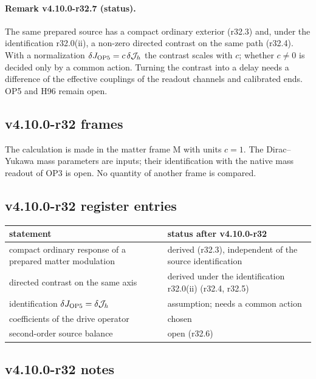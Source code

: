 \paragraph{Remark v4.10.0-r32.7 (status).}
The same prepared source has a compact ordinary exterior (r32.3) and, under the identification r32.0(ii), a non-zero directed contrast on
the same path (r32.4).  With a normalization \(\delta J_{\rm OP5}=c\,\delta\mathcal J_h\) the contrast scales with \(c\); whether \(c\neq0\) is decided only
by a common action.  Turning the contrast into a delay needs a difference of the effective couplings of the readout channels and
calibrated ends.  OP5 and H96 remain open.

\subsection*{v4.10.0-r32 frames}
\label{subsec:v4100-r32-frames}

The calculation is made in the matter frame M with units \(c=1\).  The Dirac--Yukawa mass parameters are inputs; their identification
with the native mass readout of OP3 is open.  No quantity of another frame is compared.

\subsection*{v4.10.0-r32 register entries}
\label{subsec:v4100-r32-register}

\begin{center}
\small
\begin{tabular}{@{}>{\raggedright\arraybackslash}p{}>{\raggedright\arraybackslash}p{}@{}}
\toprule
statement & status after v4.10.0-r32\\
\midrule
compact ordinary response of a prepared matter modulation & derived (r32.3), independent of the source identification\\
directed contrast on the same axis & derived under the identification r32.0(ii) (r32.4, r32.5)\\
identification \(\delta J_{\rm OP5}=\delta\mathcal J_h\) & assumption; needs a common action\\
coefficients of the drive operator & chosen\\
second-order source balance & open (r32.6)\\
\bottomrule
\end{tabular}
\end{center}

\subsection*{v4.10.0-r32 notes}
\label{subsec:v4100-r32-notes}

